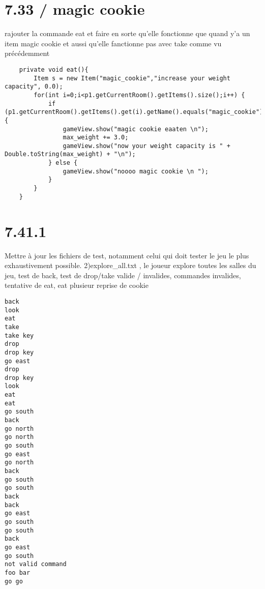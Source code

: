 \documentclass[a4paper , 10pt]{article}
\begin{document}
\section{7.33 / magic cookie}
rajouter la commande eat et faire en sorte qu'elle fonctionne que quand y'a un item magic cookie et aussi qu'elle fanctionne pas avec take comme vu précédemment 
\begin{verbatim}
    private void eat(){
        Item s = new Item("magic_cookie","increase your weight capacity", 0.0);
        for(int i=0;i<p1.getCurrentRoom().getItems().size();i++) {
            if (p1.getCurrentRoom().getItems().get(i).getName().equals("magic_cookie")) {
                gameView.show("magic cookie eaaten \n");
                max_weight += 3.0;
                gameView.show("now your weight capacity is " + Double.toString(max_weight) + "\n");
            } else {
                gameView.show("noooo magic cookie \n ");
            }
        }
    }
\end{verbatim}


\section{7.41.1}
\quad Mettre à jour les fichiers de test, notamment celui qui doit tester le jeu le plus exhaustivement possible.
2)explore\_all.txt , le joueur explore toutes les salles du jeu, test de back, test de drop/take valide / invalides, commandes invalides, tentative de eat, eat plusieur reprise de cookie

\begin{verbatim}
back
look
eat
take
take key
drop
drop key
go east
drop
drop key
look
eat
eat
go south
back
go north
go north
go south
go east
go north
back
go south
go south
back
back
go east
go south
go south
back
go east
go south
not valid command
foo bar
go go

\end{verbatim}
\end{document}
